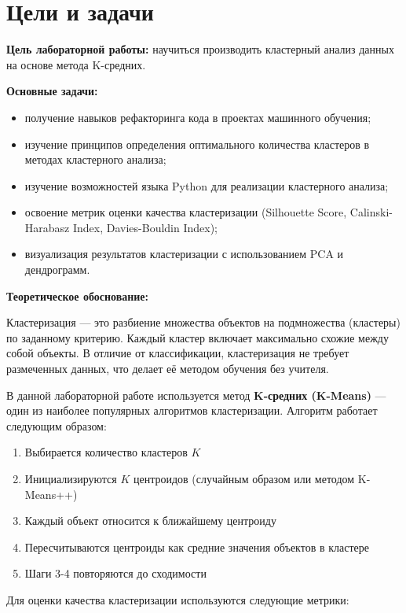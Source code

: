 \chapter*{Цели и задачи}
\label{ch:intro_lab9}

\textbf{Цель лабораторной работы:} научиться производить кластерный анализ данных на основе метода K-средних.

\textbf{Основные задачи:}
\begin{itemize}
    \item получение навыков рефакторинга кода в проектах машинного обучения;
    \item изучение принципов определения оптимального количества кластеров в методах кластерного анализа;
    \item изучение возможностей языка Python для реализации кластерного анализа;
    \item освоение метрик оценки качества кластеризации (Silhouette Score, Calinski-Harabasz Index, Davies-Bouldin Index);
    \item визуализация результатов кластеризации с использованием PCA и дендрограмм.
\end{itemize}

\textbf{Теоретическое обоснование:}

Кластеризация — это разбиение множества объектов на подмножества (кластеры) по заданному критерию. Каждый кластер включает максимально схожие между собой объекты. В отличие от классификации, кластеризация не требует размеченных данных, что делает её методом обучения без учителя.

В данной лабораторной работе используется метод \textbf{K-средних (K-Means)} — один из наиболее популярных алгоритмов кластеризации. Алгоритм работает следующим образом:

\begin{enumerate}
    \item Выбирается количество кластеров $K$
    \item Инициализируются $K$ центроидов (случайным образом или методом K-Means++)
    \item Каждый объект относится к ближайшему центроиду
    \item Пересчитываются центроиды как средние значения объектов в кластере
    \item Шаги 3-4 повторяются до сходимости
\end{enumerate}

Для оценки качества кластеризации используются следующие метрики:

